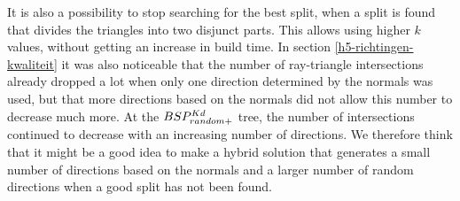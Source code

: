 It is also a possibility to stop searching for the best split, when a split is found that divides the triangles into two disjunct parts.
This allows using higher $k$ values, without getting an increase in build time.
In section \ref{h5-richtingen-kwaliteit} it was also noticeable that the number of ray-triangle intersections already dropped a lot when only one direction determined by the normals was used, but that more directions based on the normals did not allow this number to decrease much more.
At the $BSP^{Kd}_{random+}$ tree, the number of intersections continued to decrease with an increasing number of directions.
We therefore think that it might be a good idea to make a hybrid solution that generates a small number of directions based on the normals and a larger number of random directions when a good split has not been found.